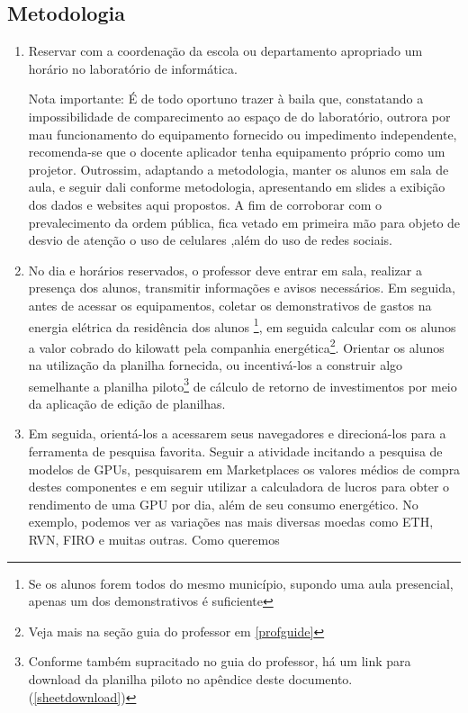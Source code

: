 \subsection{Metodologia} 
\begin{enumerate}
	\item Reservar com a coordenação da escola ou departamento apropriado um horário no laboratório de informática. 
	
	Nota importante: É de todo oportuno trazer à baila que, constatando a impossibilidade de comparecimento ao espaço de do laboratório, outrora por mau funcionamento do equipamento fornecido ou impedimento independente, recomenda-se que o docente aplicador tenha equipamento próprio como um projetor. Outrossim, adaptando a metodologia, manter os alunos em sala de aula, e seguir dali conforme metodologia, apresentando em slides a exibição dos dados e websites aqui propostos. A fim de corroborar com o prevalecimento da ordem pública, fica vetado em primeira mão para objeto de desvio de atenção o uso de celulares ,além do uso de redes sociais.
	
	\item No dia e horários reservados, o professor deve entrar em sala, realizar a presença dos alunos, transmitir informações e avisos necessários. Em seguida, antes de acessar os equipamentos, coletar os demonstrativos de gastos na energia elétrica da residência dos alunos \footnote{Se os alunos forem todos do mesmo município, supondo uma aula presencial, apenas um dos demonstrativos é suficiente}, em seguida calcular com os alunos a valor cobrado do kilowatt pela companhia energética\footnote{Veja mais na seção guia do professor em \ref{profguide}}. Orientar os alunos na utilização da planilha fornecida, ou incentivá-los a construir algo semelhante a planilha piloto\footnote{Conforme também supracitado no guia do professor, há um link para download da planilha piloto no apêndice deste documento. (\ref{sheetdownload})} de cálculo de retorno de investimentos por meio da aplicação de edição de planilhas. 
	
	\item Em seguida, orientá-los a acessarem seus navegadores e direcioná-los para a ferramenta de pesquisa favorita. Seguir a atividade incitando a pesquisa de modelos de  GPUs, pesquisarem em Marketplaces os valores médios de compra destes componentes e em seguir utilizar a calculadora de lucros para obter o rendimento de uma GPU por dia, além de seu consumo energético.
	No exemplo, podemos ver as variações nas mais diversas moedas como ETH, RVN, FIRO   e muitas outras. Como queremos
	

\end{enumerate}
